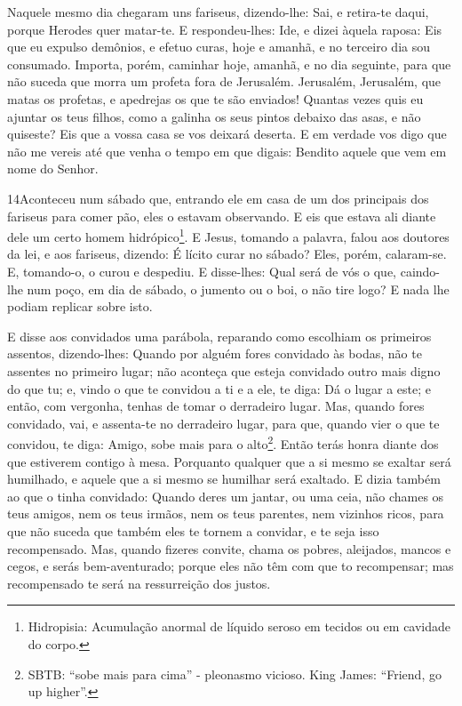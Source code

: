 Naquele mesmo dia chegaram uns fariseus, dizendo-lhe: Sai, e
retira-te daqui, porque Herodes quer matar-te. E
respondeu-lhes: Ide, e dizei àquela raposa: Eis que eu expulso
demônios, e efetuo curas, hoje e amanhã, e no terceiro dia sou
consumado. Importa, porém, caminhar hoje, amanhã, e no dia
seguinte, para que não suceda que morra um profeta fora de
Jerusalém. Jerusalém, Jerusalém, que matas os profetas, e
apedrejas os que te são enviados! Quantas vezes quis eu ajuntar os
teus filhos, como a galinha os seus pintos debaixo das asas, e não
quiseste? Eis que a vossa casa se vos deixará deserta. E em
verdade vos digo que não me vereis até que venha o tempo em que
digais: Bendito aquele que vem em nome do Senhor.

\medskip

\lettrine{14} Aconteceu num sábado que, entrando ele em casa
de um dos principais dos fariseus para comer pão, eles o estavam
observando. E eis que estava ali diante dele um certo homem
hidrópico\footnote{Hidropisia: Acumulação anormal de líquido seroso
em tecidos ou em cavidade do corpo.}. E Jesus, tomando a
palavra, falou aos doutores da lei, e aos fariseus, dizendo: É
lícito curar no sábado? Eles, porém, calaram-se. E, tomando-o, o
curou e despediu. E disse-lhes: Qual será de vós o que,
caindo-lhe num poço, em dia de sábado, o jumento ou o boi, o não
tire logo? E nada lhe podiam replicar sobre isto.

E disse aos convidados uma parábola, reparando como escolhiam os
primeiros assentos, dizendo-lhes: Quando por alguém fores
convidado às bodas, não te assentes no primeiro lugar; não aconteça
que esteja convidado outro mais digno do que tu; e, vindo o que
te convidou a ti e a ele, te diga: Dá o lugar a este; e então, com
vergonha, tenhas de tomar o derradeiro lugar. Mas, quando
fores convidado, vai, e assenta-te no derradeiro lugar, para que,
quando vier o que te convidou, te diga: Amigo, sobe mais para o
alto\footnote{SBTB: ``sobe mais para cima'' - pleonasmo vicioso.
King James: ``Friend, go up higher''.}. Então terás honra diante dos
que estiverem contigo à mesa. Porquanto qualquer que a si
mesmo se exaltar será humilhado, e aquele que a si mesmo se humilhar
será exaltado. E dizia também ao que o tinha convidado:
Quando deres um jantar, ou uma ceia, não chames os teus amigos, nem
os teus irmãos, nem os teus parentes, nem vizinhos ricos, para que
não suceda que também eles te tornem a convidar, e te seja isso
recompensado. Mas, quando fizeres convite, chama os pobres,
aleijados, mancos e cegos, e serás bem-aventurado; porque
eles não têm com que to recompensar; mas recompensado te será na
ressurreição dos justos.

